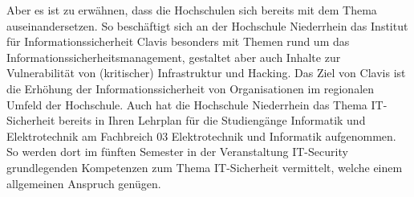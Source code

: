 Aber es ist zu erwähnen, dass die Hochschulen sich bereits mit dem Thema auseinandersetzen. 
So beschäftigt sich an der Hochschule Niederrhein das Institut für Informationssicherheit Clavis besonders mit Themen rund um das Informationssicherheitsmanagement, gestaltet aber auch Inhalte zur Vulnerabilität von (kritischer) Infrastruktur und Hacking.
Das Ziel von Clavis ist die Erhöhung der Informationssicherheit von Organisationen im regionalen Umfeld der Hochschule.
\cite{hochschuleniederrheinFlyerInstitutClavis}
Auch hat die Hochschule Niederrhein das Thema IT-Sicherheit bereits in Ihren Lehrplan für die Studiengänge Informatik und Elektrotechnik am Fachbreich 03 Elektrotechnik und Informatik aufgenommen. So werden dort im fünften Semester in der Veranstaltung IT-Security grundlegenden Kompetenzen zum Thema IT-Sicherheit vermittelt, welche einem allgemeinen Anspruch genügen.\cite{hochschuleniederrheinModulhandbuchVollzeitBA2019}